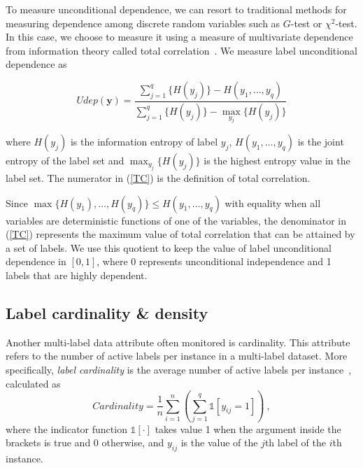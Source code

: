 \documentclass[review]{elsarticle}
\begin{document}
	To measure unconditional dependence, we can resort to traditional methods for measuring dependence among discrete random variables such as $G$-test or $\chi^{2}$-test. In this case, we choose to measure it using a measure of multivariate dependence from information theory called total correlation~\citep{refTC1,refTC2,refTC3}. We measure label unconditional dependence as  
	
	\begin{equation}\label{TC}
	Udep(\mathbf{y}) = \frac{\sum^{q}_{j=1}{ \{ H(y_{j}) \} - H(y_{1},\ldots,y_{q})}}{\sum^{q}_{j=1}{ \{ H(y_{j}) \} - \max_{y_{j}} \{H(y_{j})\} }}
	\end{equation}
	
	where $H(y_{j})$ is the information entropy of label $y_{j}$, $H(y_{1},\ldots,y_{q})$ is the joint entropy of the label set and $\max_{y_{j}} \{H(y_{j})\}$ is the highest entropy value in the label set. The numerator in (\ref{TC}) is the definition of total correlation. 
	
	Since $\max \{ H(y_{1}),\ldots,H(y_{q}) \} \leq H(y_{1},\ldots,y_{q})$ with equality when all variables are deterministic functions of one of the variables, the denominator in (\ref{TC}) represents the maximum value of total correlation that can be attained by a set of labels. We use this quotient to keep the value of label unconditional dependence in $[0,1]$, where 0 represents unconditional independence and 1 labels that are highly dependent.
	
	\subsection{Label cardinality \& density}
	
	Another multi-label data attribute often monitored is cardinality. This attribute refers to the number of active labels per instance in a multi-label dataset. More specifically, \emph{label cardinality} is the average number of active labels per instance~\citep{Tsoumakas:07,Gibaja:15}, calculated as
	\begin{equation}
	Cardinality = \frac{1}{n} \sum^{n}_{i=1}{\left(\sum^{q}_{j=1}{\mathds{1}\left[y_{ij} = 1 \right]}\right)}\ ,
	\end{equation}
	where the indicator function $\mathds{1}[\cdot]$ takes value 1 when the argument inside the brackets is true and 0 otherwise, and $y_{ij}$ is the value of the $j$th label of the $i$th instance.
	
\end{document}

